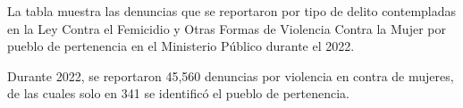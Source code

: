 \justifying La tabla muestra las denuncias que se reportaron por tipo de delito contempladas en la Ley Contra el Femicidio y Otras Formas de Violencia Contra la Mujer por pueblo de pertenencia en el Ministerio Público durante el 2022. 

Durante 2022, se reportaron 45,560 denuncias por violencia en contra de mujeres, de las cuales solo en 341 se identificó el pueblo de pertenencia.
